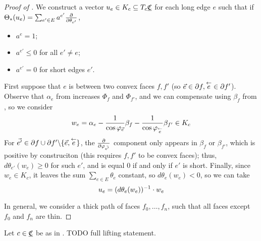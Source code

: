 \begin{proof}[Proof of ]
We construct a vector $u_e \in K_c \subseteq T_c {\underline{\mathfrak{C}}}$ for each long edge $e$
such that if $\Theta_*(u_e) = \sum_{e' \in E} a^{e'} {\frac{\partial}{\partial \theta_{e'}}}$,
\begin{itemize}
	\item $a^e = 1$;
	\item $a^{e'} \leq 0$ for all $e' \neq e$;
	\item $a^{e'} = 0$ for short edges $e'$.
\end{itemize}

First suppose that $e$ is between two convex faces $f, f'$
(so $\vec{e} \in \partial f, \overset{\leftarrow}{e} \in \partial f'$).
Observe that $\alpha_e$ from 
increases $\Phi_f$ and $\Phi_{f'}$,
and we can compensate using $\beta_f$ from ,
so we consider
\[
w_e = \alpha_e - \frac{1}{\cos \varphi_{\vec{e}}} \beta_f
	- \frac{1}{\cos \varphi_{\overset{\leftarrow}{e}}} \beta_{f'} \in K_c
\]
For $\vec{e'} \in \partial f \cup \partial f' \backslash \{\vec{e},\overset{\leftarrow}{e}\}$,
the ${\frac{\partial}{\partial \varphi_{\vec{e'}}}}$ component only appears in $\beta_f$
or $\beta_{f'}$, which is positive by construciton
(this requires $f,f'$ to be convex faces);
thus, $d\theta_{e'}(w_e) \geq 0$ for such $e'$, and
is equal 0 if and only if $e'$ is short.
Finally, since $w_e \in K_c$, it leaves the sum $\sum_{e\in E} \theta_e$
constant, so $d\theta_e(w_e) < 0$, so we can take
\begin{equation}
\label{e:u_e}
u_e = (d\theta_e(w_e))^{-1} \cdot w_e
\end{equation}

In general, we consider a thick path of faces $f_0, \ldots, f_n$,
such that all faces except $f_0$ and $f_n$ are thin.


\end{proof}


\begin{proposition}
Let $c\in {\underline{\mathfrak{C}}}$ be as in .
TODO full lifting statement.
\end{proposition}


